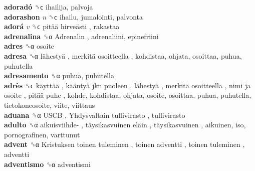 \textbf{adoradó} ␝ϲ  ihailija, palvoja  \\
\textbf{adorashon} \emph{n}  ␝ϲ  ihailu, jumalointi, palvonta  \\
\textbf{adorá} \emph{v}  ␝ϲ   pitää hirveästi , rakastaa  \\
\textbf{adrenalina} ␝α   Adrenalin , adrenaliini, epinefriini  \\
\textbf{adres} ␝α  osoite  \\
\textbf{adresa} ␝α   lähestyä ,  merkitä osoitteella , kohdistaa, ohjata, osoittaa, puhua, puhutella  \\
\textbf{adresamento} ␝α  puhua, puhutella  \\
\textbf{adrès} ␝ϲ   käyttää ,  kääntyä jkn puoleen ,  lähestyä ,  merkitä osoitteella ,  nimi ja osoite ,  pitää puhe , kohde, kohdistaa, ohjata, osoite, osoittaa, puhua, puhutella, tietokoneosoite, viite, viittaus  \\
\textbf{aduana} ␝α   USCB ,  Yhdysvaltain tullivirasto , tullivirasto  \\
\textbf{adulto} ␝α   aikuisviihde- ,  täysikasvuinen eläin ,  täysikasvuinen , aikuinen, iso, pornografinen, varttunut  \\
\textbf{advent} ␝α   Kristuksen toinen tuleminen ,  toinen adventti ,  toinen tuleminen , adventti  \\
\textbf{adventismo} ␝α  adventismi  \\
